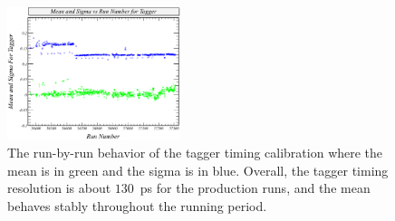 \begin{figure}[htpb]
\begin{center}
 \includegraphics[width=0.45\textwidth]{figures/calib/tag/timing/tagRun.eps}
  \caption{The run-by-run behavior of the tagger timing calibration where the mean is in green and the sigma is in blue. Overall, the tagger timing resolution is about $130$~ps for the production runs, and the mean behaves stably throughout the running period.}
  \label{tagRun}
  \end{center}
\end{figure}
